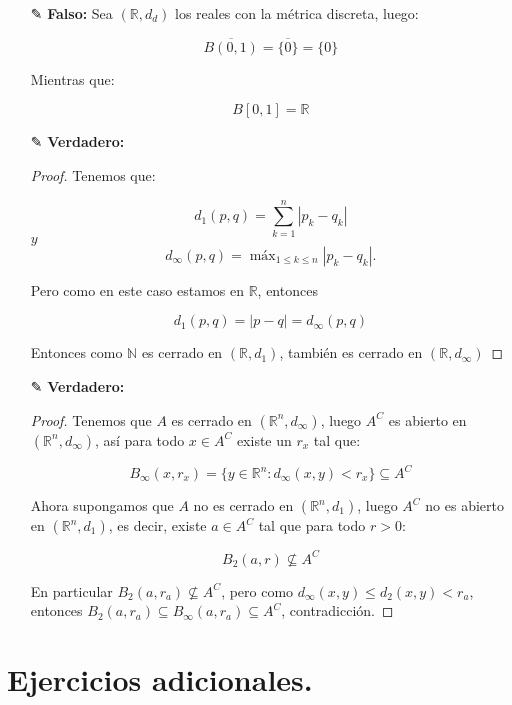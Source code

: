 \begin{itemize}[leftmargin=*]
    \item[✎] \textbf{Falso: }Sea $(\mathbb{R},d_d)$ los reales con la métrica discreta, luego:

    $$\overline{B(0,1)}=\overline{\{0\}}=\{0\}$$

Mientras que:

$$B[0,1]=\mathbb{R}$$

    \item[✎]\textbf{Verdadero: }\\
    \begin{proof}
        Tenemos que: 

    $$
d_1(p, q)=\sum_{k=1}^n\left|p_k-q_k\right|
$$
$y$
$$
d_{\infty}(p, q)=\operatorname{máx}_{1 \leq k \leq n}\left|p_k-q_k\right| .
$$

Pero como en este caso estamos en $\mathbb{R}$, entonces 

$$
d_1(p, q)=|p-q|=d_{\infty}(p,q)
$$

Entonces como $\mathbb{N}$ es cerrado en $(\mathbb{R},d_1)$, también es cerrado en $(\mathbb{R},d_{\infty})$

    \end{proof}

    \item[✎]\textbf{Verdadero: }\\
    
   \begin{proof}
         Tenemos que $A$ es cerrado en $(\mathbb{R}^n,d_{\infty})$, luego $A^C$ es abierto en $(\mathbb{R}^n,d_{\infty})$, así para todo $x\in A^C$ existe un $r_x$ tal que:

         $$B_{\infty}(x,r_x)=\{y\in \mathbb{R}^n: d_{\infty}(x,y)<r_x\}\subseteq A^C$$

         Ahora supongamos que $A$ no es cerrado en $(\mathbb{R}^n,d_1)$, luego $A^C$ no es abierto en $(\mathbb{R}^n,d_1)$, es decir, existe $a \in A^C$ tal que para todo $r>0$:

         $$B_2(a,r)\not \subseteq A^C$$

         En particular $B_2(a,r_a)\not \subseteq A^C$, pero como $d_{\infty}(x,y)\leq d_2(x,y)<r_a$, entonces $B_2(a,r_a)\subseteq B_{\infty}(a,r_a)\subseteq A^C$, contradicción.
         
    \end{proof}
    
   

    
\end{itemize}
\vspace{0.3cm}
 \section{Ejercicios adicionales.}
    
